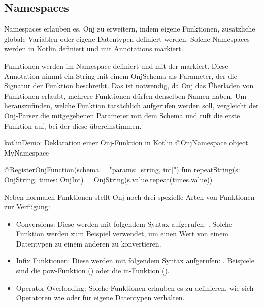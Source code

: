 
\subsection{Namespaces}\label{subsec:namespaces}

\renewcommand{\kapitelautor}{Autor: Marvin Kurka}

Namespaces erlauben es, Onj zu erweitern, indem eigene Funktionen, zusätzliche globale Variablen oder
eigene Datentypen definiert werden.
Solche Namespaces werden in Kotlin definiert und mit Annotations markiert.

Funktionen werden im Namespace definiert und mit der  markiert.
Diese Annotation nimmt ein String mit einem OnjSchema als Parameter, der die Signatur der Funktion beschreibt.
Das ist notwendig, da Onj das Überladen von Funktionen erlaubt, \dah mehrere Funktionen dürfen denselben Namen haben.
Um herauszufinden, welche Funktion tatsächlich aufgerufen werden soll, vergleicht der Onj-Parser die mitgegebenen
Parameter mit dem Schema und ruft die erste Funktion auf, bei der diese übereinstimmen.

\begin{codeBlock}{kotlin}{Demo: Deklaration einer Onj-Funktion in Kotlin}
@OnjNamespace
object MyNamespace {

    @RegisterOnjFunction(schema = "params: [string, int]")
    fun repeatString(s: OnjString, times: OnjInt) = OnjString(s.value.repeat(times.value))
}
\end{codeBlock}

Neben normalen Funktionen stellt Onj noch drei spezielle Arten von Funktionen zur Verfügung:

\begin{itemize}
    \item Conversions: Diese werden mit folgendem Syntax aufgerufen: .
        Solche Funktion werden zum Beispiel verwendet, um einen Wert von einem Datentypen zu einem anderen zu
        konvertieren.
    \item Infix Funktionen: Diese werden mit folgendem Syntax aufgerufen: .
        Beispiele sind die pow-Funktion () oder die in-Funktion (\inlineOnj{3 in [1, 2, 3, 4]}).
    \item Operator Overloading: Solche Funktionen erlauben es zu definieren, wie sich Operatoren wie
        \inlineOnj{+} oder \inlineOnj{*} für eigene Datentypen verhalten.
\end{itemize}

